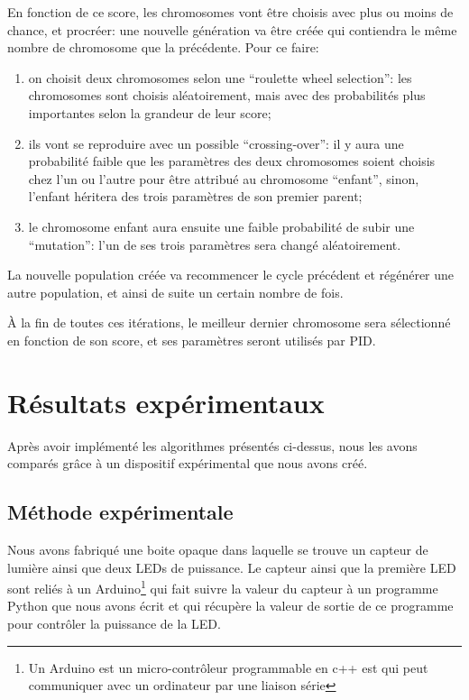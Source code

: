 \documentclass[a4paper,10pt]{report}
\begin{document}
En fonction de ce score, les chromosomes vont être choisis avec plus ou moins de chance, et procréer: une nouvelle génération va être créée qui contiendra le même nombre de chromosome que la précédente. Pour ce faire:
\begin{enumerate}
  \item on choisit deux chromosomes selon une ``roulette wheel selection'': les chromosomes sont choisis aléatoirement, mais avec des probabilités plus importantes selon la grandeur de leur score;
  \item ils vont se reproduire avec un possible ``crossing-over'': il y aura une probabilité faible que les paramètres des deux chromosomes soient choisis chez l'un ou l'autre pour être attribué au chromosome ``enfant'', sinon, l'enfant héritera des trois paramètres de son premier parent;
  \item le chromosome enfant aura ensuite une faible probabilité de subir une ``mutation'': l'un de ses trois paramètres sera changé aléatoirement.
\end{enumerate}

La nouvelle population créée va recommencer le cycle précédent et régénérer une autre population, et ainsi de suite un certain nombre de fois.

À la fin de toutes ces itérations, le meilleur dernier chromosome sera sélectionné en fonction de son score, et ses paramètres seront utilisés par PID.


\chapter{Résultats expérimentaux}

Après avoir implémenté les algorithmes présentés ci-dessus, nous les avons comparés grâce à un dispositif expérimental que nous avons créé.

\section{Méthode expérimentale}
\label{sec:methode}
Nous avons fabriqué une boite opaque dans laquelle se trouve un capteur de lumière ainsi que deux LEDs de puissance. Le capteur ainsi que la première LED sont reliés à un Arduino\footnote{Un Arduino est un micro-contrôleur programmable en c++ est qui peut communiquer avec un ordinateur par une liaison série} qui fait suivre la valeur du capteur à un programme Python que nous avons écrit et qui récupère la valeur de sortie de ce programme pour contrôler la puissance de la LED.
\end{document}
